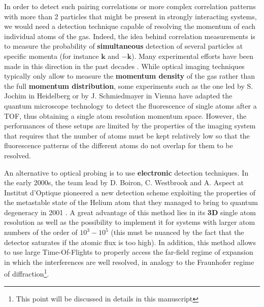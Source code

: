 In order to detect such pairing correlations or more complex correlation patterns with more than 2 particles that might be present in strongly interacting systems, we would need a detection technique capable of resolving the momentum of each individual atoms of the gas. Indeed, the idea behind correlation measurements is to measure the probability of \textbf{simultaneous} detection of several particles at specific momenta (for instance $\bm{k}$ and $-\bm{k}$). Many experimental efforts have been made in this direction in the past decades \cite{ott2016single}. While optical imaging techniques typically only allow to measure the \textbf{momentum density} of the gas rather than the full \textbf{momentum distribution}, some experiments such as the one led by S. Jochim in Heidelberg \cite{serwane2011deterministic} or by J. Schmiedmayer in Vienna \cite{bucker2009single} have adapted the quantum microscope technology to detect the fluorescence of single atoms after a TOF, thus obtaining a single atom resolution momentum space. However, the performances of these setups are limited by the properties of the imaging system that requires that the number of atoms must be kept relatively low so that the fluorescence patterns of the different atoms do not overlap for them to be resolved.

An alternative to optical probing is to use \textbf{electronic} detection techniques. In the early 2000s, the team lead by D. Boiron, C. Westbrook and A. Aspect at Institut d'Optique pioneered a new detection scheme exploiting the properties of the metastable state of the Helium atom that they managed to bring to quantum degeneracy in 2001 \cite{robert2001bose}. A great advantage of this method lies in its \textbf{3D} single atom resolution as well as the possibility to implement it for systems with larger atom numbers of the order of $10^3-10^5$ (this must be nuanced by the fact that the detector saturates if the atomic flux is too high). In addition, this method allows to use large Time-Of-Flights to properly access the far-field regime of expansion in which the interferences are well resolved, in analogy to the Fraunhofer regime of diffraction\footnote{This point will be discussed in details in this manuscript}.

